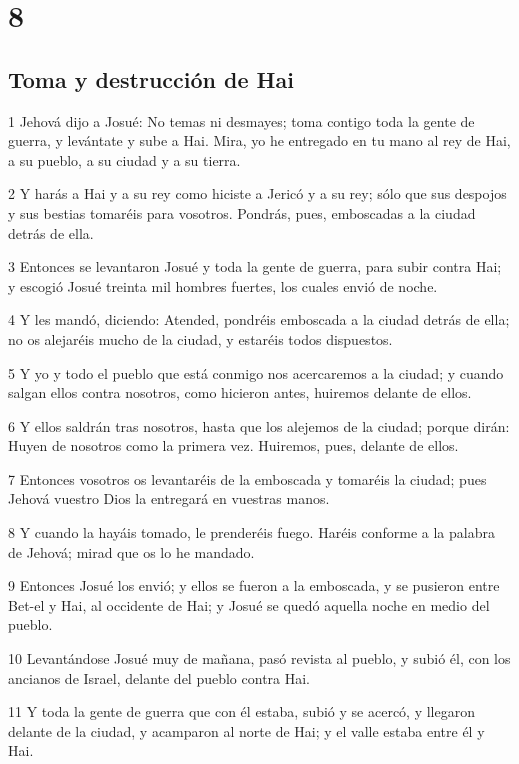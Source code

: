 \chapter{8}

\section*{Toma y destrucción de Hai}

\par 1 Jehová dijo a Josué: No temas ni desmayes; toma contigo toda la gente de guerra, y levántate y sube a Hai. Mira, yo he entregado en tu mano al rey de Hai, a su pueblo, a su ciudad y a su tierra.
\par 2 Y harás a Hai y a su rey como hiciste a Jericó y a su rey; sólo que sus despojos y sus bestias tomaréis para vosotros. Pondrás, pues, emboscadas a la ciudad detrás de ella.
\par 3 Entonces se levantaron Josué y toda la gente de guerra, para subir contra Hai; y escogió Josué treinta mil hombres fuertes, los cuales envió de noche.
\par 4 Y les mandó, diciendo: Atended, pondréis emboscada a la ciudad detrás de ella; no os alejaréis mucho de la ciudad, y estaréis todos dispuestos.
\par 5 Y yo y todo el pueblo que está conmigo nos acercaremos a la ciudad; y cuando salgan ellos contra nosotros, como hicieron antes, huiremos delante de ellos.
\par 6 Y ellos saldrán tras nosotros, hasta que los alejemos de la ciudad; porque dirán: Huyen de nosotros como la primera vez. Huiremos, pues, delante de ellos.
\par 7 Entonces vosotros os levantaréis de la emboscada y tomaréis la ciudad; pues Jehová vuestro Dios la entregará en vuestras manos.
\par 8 Y cuando la hayáis tomado, le prenderéis fuego. Haréis conforme a la palabra de Jehová; mirad que os lo he mandado.
\par 9 Entonces Josué los envió; y ellos se fueron a la emboscada, y se pusieron entre Bet-el y Hai, al occidente de Hai; y Josué se quedó aquella noche en medio del pueblo.
\par 10 Levantándose Josué muy de mañana, pasó revista al pueblo, y subió él, con los ancianos de Israel, delante del pueblo contra Hai.
\par 11 Y toda la gente de guerra que con él estaba, subió y se acercó, y llegaron delante de la ciudad, y acamparon al norte de Hai; y el valle estaba entre él y Hai.

